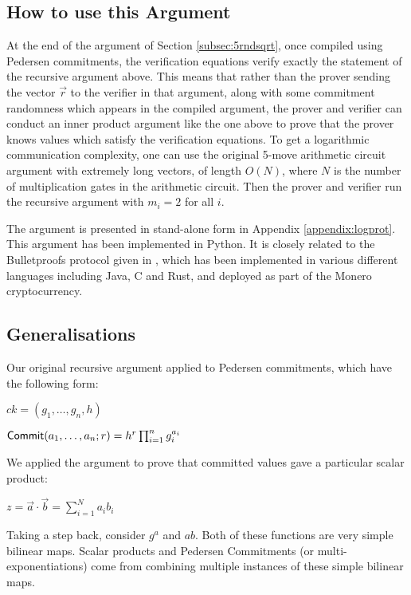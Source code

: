 \subsection{How to use this Argument}

At the end of the argument of Section \ref{subsec:5rndsqrt}, once compiled using Pedersen commitments, the verification equations verify exactly the statement of the recursive argument above. This means that rather than the prover sending the vector $\vec{r}$ to the verifier in that argument, along with some commitment randomness which appears in the compiled argument, the prover and verifier can conduct an inner product argument like the one above to prove that the prover knows values which satisfy the verification equations. To get a logarithmic communication complexity, one can use the original 5-move arithmetic circuit argument with extremely long vectors, of length $O(N)$, where $N$ is the number of multiplication gates in the arithmetic circuit. Then the prover and verifier run the recursive argument with $m_i = 2$ for all $i$.

The argument is presented in stand-alone form in Appendix \ref{appendix:logprot}. This argument has been implemented in Python. It is closely related to the Bulletproofs protocol given in \cite{BunzBBPWM18}, which has been implemented in various different languages including Java, C and Rust, and deployed as part of the Monero cryptocurrency.
\subsection{Generalisations}

Our original recursive argument applied to Pedersen commitments, which have the following form:

$ck = (g_1,\ldots,g_n,h)$

$ \mathsf{Commit} (a_1,\ldots,a_n;r) = h^r \prod_{i=1}^n g_i^{a_i}$

We applied the argument to prove that committed values gave a particular scalar product:

$z = \vec{a} \cdot \vec{b} = \sum_{i=1}^N a_i b_i$

Taking a step back, consider $g^a$ and $ab$. Both of these functions are very simple bilinear maps. Scalar products and Pedersen Commitments (or multi-exponentiations) come from combining multiple instances of these simple bilinear maps.

